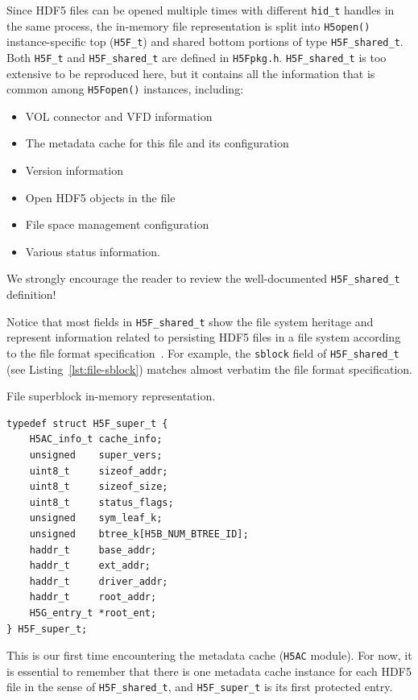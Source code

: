 Since HDF5 files can be opened multiple times with different \texttt{hid\_t} handles in the same process, the in-memory file representation is split into \texttt{H5open()} instance-specific top (\texttt{H5F\_t}) and shared bottom portions of type \texttt{H5F\_shared\_t}. Both \texttt{H5F\_t} and \texttt{H5F\_shared\_t} are defined in \texttt{H5Fpkg.h}. \texttt{H5F\_shared\_t} is too extensive to be reproduced here, but it contains all the information that is common among \texttt{H5Fopen()} instances, including:

 \begin{itemize}
     \item VOL connector and VFD information
     \item The metadata cache for this file and its configuration
     \item Version information
     \item Open HDF5 objects in the file
     \item File space management configuration
     \item Various status information.
 \end{itemize}
We strongly encourage the reader to review the well-documented \texttt{H5F\_shared\_t} definition!

Notice that most fields in \texttt{H5F\_shared\_t} show the file system heritage and represent information related to persisting HDF5 files in a file system according to the file format specification~\cite{ffmt}. For example, the \texttt{sblock} field of \texttt{H5F\_shared\_t} (see Listing~\ref{lst:file-sblock}) matches almost verbatim the file format specification.

\begin{listing}
\centering
\caption{File superblock in-memory representation.}
\label{lst:file-sblock}
\begin{verbatim}
typedef struct H5F_super_t {
    H5AC_info_t cache_info;
    unsigned    super_vers;
    uint8_t     sizeof_addr;
    uint8_t     sizeof_size;
    uint8_t     status_flags;
    unsigned    sym_leaf_k;
    unsigned    btree_k[H5B_NUM_BTREE_ID];
    haddr_t     base_addr;
    haddr_t     ext_addr;
    haddr_t     driver_addr;
    haddr_t     root_addr;
    H5G_entry_t *root_ent;
} H5F_super_t;
\end{verbatim}
\end{listing}

This is our first time encountering the metadata cache (\texttt{H5AC} module). For now, it is essential to remember that there is one metadata cache instance for each HDF5 file in the sense of \texttt{H5F\_shared\_t}, and \texttt{H5F\_super\_t} is its first protected entry.


